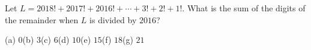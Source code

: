 Let $L=2018!+2017!+2016!+\cdots+3!+2!+1!$. What is the sum of the digits of the remainder when $L$ is divided by $2016$?

(a) $0$\quad (b) $3$\quad (c) $6$\quad (d) $10$\quad (e) $15$\quad (f) $18$\quad (g) $21$
